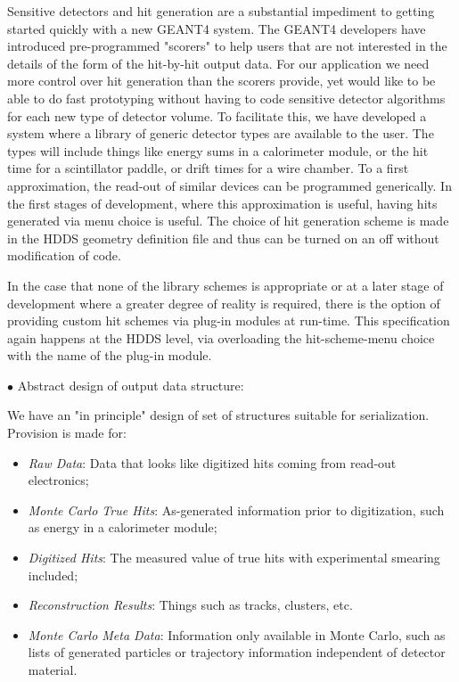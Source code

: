 Sensitive detectors and hit generation are a substantial impediment to 
getting started quickly with a new GEANT4 system. The GEANT4 developers have 
introduced pre-programmed "scorers" to help users that are not interested in 
the details of the form of the hit-by-hit output data. For our application we 
need more control over hit generation than the scorers provide, yet would like 
to be able to do fast prototyping without having to code sensitive detector 
algorithms for each new type of detector volume. To facilitate this, we have 
developed a system where a library of generic detector types are available to 
the user. The types will include things like energy sums in a calorimeter 
module, or the hit time for a scintillator paddle, or drift times for a wire 
chamber. To a first approximation, the read-out of similar devices can be 
programmed generically. In the first stages of development, where this 
approximation is useful, having hits generated via menu choice is useful. 
The choice of hit generation scheme is made in the HDDS geometry definition 
file and thus can be turned on an off without modification of code.

In the case that none of the library schemes is appropriate or at a later 
stage of development where a greater degree of reality is required, there 
is the option of providing custom hit schemes via plug-in modules at run-time. 
This specification again happens at the HDDS level, via overloading the 
hit-scheme-menu choice with the name of the plug-in module.

\vskip 0.3cm

\noindent
$\bullet$ Abstract design of output data structure:

We have an "in principle" design of set of structures suitable for 
serialization. Provision is made for:

\begin{itemize}
\item {\it Raw Data}: Data that looks like digitized hits coming from read-out 
electronics;
\item {\it Monte Carlo True Hits}: As-generated information prior to 
digitization, such as energy in a calorimeter module;
\item {\it Digitized Hits}: The measured value of true hits with experimental 
smearing included; 
\item {\it Reconstruction Results}: Things such as tracks, clusters, etc.
\item {\it Monte Carlo Meta Data}: Information only available in Monte Carlo, 
such as lists of generated particles or trajectory information independent 
of detector material.
\end{itemize}


